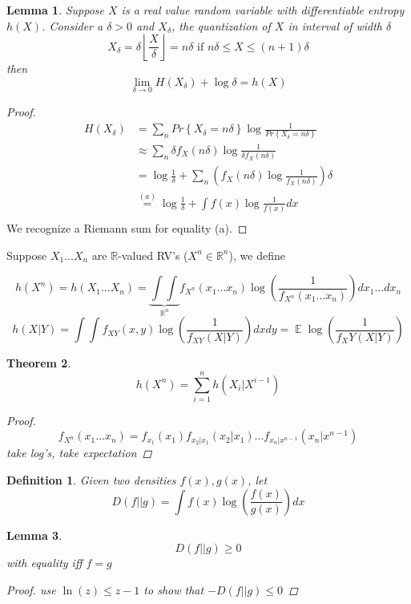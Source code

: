 \documentclass{article}
\newtheorem{theorem}{Theorem}[section]
\newtheorem{lemma}[theorem]{Lemma}
\newtheorem{definition}{Definition}[section]
\theoremstyle{definition} %
\renewcommand{\Pr}[1]{Pr\left\{#1\right\}}
\newcommand{\overeq}[1]{\stackrel{#1}{=}}
\def\R{\mathbb{R}}
\DeclareMathOperator{\E}{\mathbb{E}}%
\begin{document}
\begin{lemma}
  Suppose $X$ is a real value random variable with differentiable entropy $h(X)$. Consider a $\delta > 0$ and $X_\delta$, the quantization of $X$ in interval of width $\delta$
  \[
    X_\delta = \delta \left\lfloor \frac X \delta \right\rfloor = n\delta \text{ if } n\delta \leq X \leq (n+1) \delta
  \]
  then
  \[
    \lim_{\delta \to 0} H(X_\delta) + \log \delta = h(X)
  \]
\end{lemma}

\begin{proof}
\begin{align*}
  H(X_\delta) &= \sum_n \Pr{X_\delta = n\delta} \log \frac 1 {\Pr{X_\delta = n\delta}}\\
  &\approx \sum_n \delta f_X(n\delta) \log \frac 1 {\delta f_X(n\delta)}\\
  &= \log \frac 1 \delta + \sum_n \left(f_X(n\delta) \log \frac 1 {f_X(n\delta)} \right)\delta\\
  &\overeq{(a)} \log \frac 1 \delta + \int f(x) \log \frac 1 {f(x)} dx\\
\end{align*}
We recognize a Riemann sum for equality (a).
\end{proof}




Suppose $X_1 ... X_n$ are $\R$-valued RV's ($X^n \in \R^n$), we define

\[
  h(X^n) = h(X_1 ... X_n) = \underbrace{\int \int}_{\R^n} f_{X^n} (x_1 ... x_n) \log(\frac{1}{f_{X^n}(x_1 ... x_n)}) dx_1...dx_n
\]
\[
  h(X|Y) = \int \int f_{XY}(x, y) \log(\frac{1}{f_{XY}(X|Y)}) dx dy = \E{\log(\frac{1}{f_XY(X | Y)})}
\]

\begin{theorem}
  \[
    h(X^n) = \sum_{i = 1}^n h(X_i | X^{i - 1})
  \]
  \begin{proof}
    \[
      f_{X^n}(x_1 ... x_n) = f_{x_1}(x_1) f_{x_2 | x_1}(x_2 | x_1) ... f_{x_n | x^{n-1}}(x_n | x^{n-1})
    \]
    take log's, take expectation
  \end{proof}
\end{theorem}

\begin{definition}
  Given two densities $f(x), g(x)$, let
  \[
    D(f || g) = \int f(x) \log(\frac{f(x)}{g(x)}) dx
  \]
\end{definition}

\begin{lemma}
  \[
    D(f || g) \geq 0
  \]
  with equality iff $f = g$
  \begin{proof}
    use $\ln(z) \leq z - 1$ to show that $-D(f||g) \leq 0$
  \end{proof}
\end{lemma}
\end{document}

